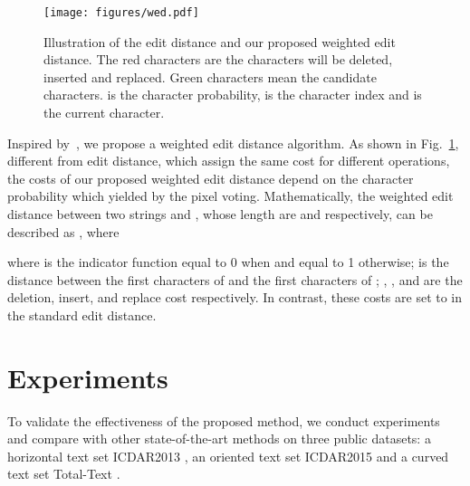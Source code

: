 \documentclass[runningheads]{llncs}
\begin{document}
\begin{figure}[!bp]
\begin{center}
\texttt{[image: figures/wed.pdf]}
\end{center}
\caption{Illustration of the edit distance and our proposed weighted edit distance. The red characters are the characters will be deleted, inserted and replaced. Green characters mean the candidate characters.  is the character probability,  is the character index and  is the current character.}
\label{fig:wed}
\end{figure}

Inspired by~\cite{yao2014unified}, we propose a weighted edit distance algorithm. As shown in Fig.~\ref{fig:wed}, different from edit distance,  which assign the same cost for different operations, the costs of our proposed weighted edit distance depend on the character probability  which yielded by the pixel voting. Mathematically, the weighted edit distance between two strings  and , whose length are  and  respectively, can be described as , where

where  is the indicator function equal to 0 when  and equal to 1 otherwise;  is the distance between the first  characters of  and the first  characters of ; , , and  are the deletion, insert, and replace cost respectively. In contrast, these costs are set to  in the standard edit distance.


\section{Experiments}

To validate the effectiveness of the proposed method, we conduct experiments and compare with other state-of-the-art methods on three public datasets: a horizontal text set ICDAR2013 \cite{karatzas2013icdar}, an oriented text set ICDAR2015 \cite{karatzas2015icdar} and a curved text set Total-Text \cite{CK2017}.
\end{document}
